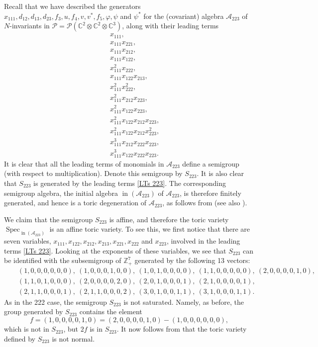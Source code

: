 \documentclass[reqno,11pt]{amsart}
\theoremstyle{remark}
\theoremstyle{definition}
\numberwithin{equation}{section}
\newcommand\ot{\otimes}
\newcommand\ini{\operatorname{in}}
\newcommand\Spec{\operatorname{Spec}}
\newcommand{\bbC}{\mathbb{C}}
\newcommand{\bbZ}{\mathbb{Z}}
\newcommand{\Pol}{\mathcal{P}}
\newcommand{\cA}{\mathcal{A}}
\begin{document}
Recall that we have described the generators $x_{111},d_{12},d_{13},d_{23},f_3,u,f_4,v,v^*,f_5,\varphi,\psi$ and $\psi^*$ for the (covariant) algebra $\cA_{223}$ of $N$-invariants in $\Pol=\Pol(\bbC^2\otimes\bbC^2\ot\bbC^3)$, along with their leading terms
\begin{eqnarray}\label{LTs 223}
&&x_{111},\\ \nonumber
&&x_{111}x_{221},\\ \nonumber
&&x_{111}x_{212},\\ \nonumber
&&x_{111}x_{122},\\\nonumber
&&x_{111}^2x_{222},\\ \nonumber
&&x_{111}x_{122}x_{213}, \\\nonumber
&&x_{111}^2x_{222}^2,\\ \nonumber
&&x_{111}^2x_{212}x_{223}, \\\nonumber
&&x_{111}^2x_{122}x_{223}, \\ \nonumber
&&x_{111}^2x_{122}x_{212}x_{223}, \\ \nonumber
&&x_{111}^2 x_{122}x_{212}x_{223}^2,\\ \nonumber
&&x_{111}^3 x_{212}x_{222}x_{223}, \\ \nonumber
&&x_{111}^3 x_{122}x_{222}x_{223}.
\end{eqnarray}
It is clear that all the leading terms of monomials in $\cA_{223}$ define a semigroup (with respect to multiplication). Denote this semigroup by $S_{223}$. It is also clear that $S_{223}$ is generated by the leading terms \eqref{LTs 223}. The corresponding semigroup algebra, the initial algebra $\ini(\cA_{223})$ of $\cA_{223}$, is therefore finitely generated, and hence is a toric degeneration of $\cA_{223}$, as follows from \cite{CHV} (see also \cite[Proposition 2.5.2]{HJLTW}). 

We claim that the semigroup $S_{223}$ is affine, and therefore the toric variety $\Spec_{\ini(\cA_{223})}$ is an affine toric variety. To see this, we first notice that there are seven variables, $x_{111},x_{122},x_{212},x_{213},x_{221},x_{222}$ and $x_{223}$, involved in the leading terms \eqref{LTs 223}. Looking at the exponents of these variables, we see that $S_{223}$ can be identified with the subsemigroup of $\bbZ_+^7$ generated by the following 13 vectors:
\begin{eqnarray*}
&&(1,0,0,0,0,0,0),\ (1,0,0,0,1,0,0),\ (1,0,1,0,0,0,0),\ (1,1,0,0,0,0,0),\ (2,0,0,0,0,1,0),\\  &&(1,1,0,1,0,0,0),\ (2,0,0,0,0,2,0),\ (2,0,1,0,0,0,1),\ (2,1,0,0,0,0,1),\\
&&(2,1,1,0,0,0,1),\ (2,1,1,0,0,0,2),\ (3,0,1,0,0,1,1),\ (3,1,0,0,0,1,1).
\end{eqnarray*}
As in the 222 case, the semigroup $S_{223}$ is not saturated. Namely, as before, the group generated by $S_{223}$ contains the element
\[
f=(1,0,0,0,0,1,0)=(2,0,0,0,0,1,0)-(1,0,0,0,0,0,0),
\] 
which is not in $S_{223}$, but $2f$ is in $S_{223}$. It now follows from \cite[Theorem 1.3.5]{C} that the toric variety defined by $S_{223}$ is not normal.
\end{document}

